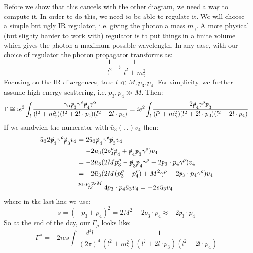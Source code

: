 Before we show that this cancels with the other diagram, we need a way to compute it. In order to do this, we need to be able to regulate it. We will choose a simple but ugly IR regulator, i.e. giving the photon a mass $m_\gamma$. A more physical (but slighty harder to work with) regulator is to put things in a finite volume which gives the photon a maximum possible wavelength. In any case, with our choice of regulator the photon propagator transforms as:
\begin{equation}
    \frac{1}{l^2} \to \frac{1}{l^2 + m_\gamma^2}
\end{equation}
Focusing on the IR divergences, take $l \ll M, p_3, p_4$. For simplicity, we further assume high-energy scattering, i.e. $p_3, p_4 \gg M$. Then:
\begin{equation}
    \Gamma \cong ie^2\int_l \frac{\gamma_\alpha\slashed{p}_3\gamma^\rho \slashed{p}_4\gamma^\alpha}{(l^2 + m_\gamma^2)(l^2 + 2l \cdot p_3)(l^2 - 2l \cdot p_4)} = ie^2\int_l \frac{2\slashed{p}_4\gamma^\rho \slashed{p}_3}{(l^2 + m_\gamma^2)(l^2 + 2l \cdot p_3)(l^2 - 2l \cdot p_4)}
\end{equation}
If we sandwich the numerator with $\bar{u}_3 (\ldots)v_4$ then:
\begin{equation}
    \begin{split}
        \bar{u}_3 2\slashed{p}_4\gamma^\rho \slashed{p}_3v_4 &= 2\bar{u}_3\slashed{p}_4 \gamma^\rho \slashed{p}_3v_4 
        \\ &= -2\bar{u}_3(2p_3^\rho \slashed{p}_4 + \slashed{p}_4\slashed{p}_3 \gamma^\rho)v_4 
        \\ &= -2\bar{u}_3(2Mp_3^\rho - \slashed{p}_3\slashed{p}_4 \gamma^\rho - 2p_3 \cdot p_4 \gamma^\rho)v_4 
        \\ &= -2\bar{u}_3(2M(p_3^\rho - p_4^\rho) + M^2\gamma^\rho - 2p_3 \cdot p_4 \gamma^\rho)v_4 
        \\ &\stackrel{p_3, p_4 \gg M}{\approx} 4p_3 \cdot p_4 \bar{u}_3v_4 = -2s\bar{u}_3v_4
    \end{split}
\end{equation}
where in the last line we use:
\begin{equation}
    s = (-p_3 + p_4)^2 = 2M^2 - 2p_3 \cdot p_4 \approx -2p_3 \cdot p_4
\end{equation}
So at the end of the day, our $\Gamma_\rho$ looks like:
\begin{equation}
    \Gamma^\rho = -2ies\int \frac{d^4l}{(2\pi)^4}\frac{1}{(l^2 + m_\gamma^2)(l^2 + 2l \cdot p_3)(l^2 - 2l \cdot p_4)}
\end{equation}
